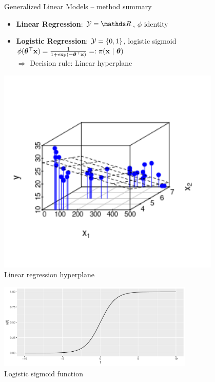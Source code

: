 \begin{vbframe}{Generalized Linear Models -- method summary}
\begin{itemize}
  \item \textbf{Linear Regression}: $\Yspace = \R$, $\phi$ identity
  \item \textbf{Logistic Regression}: $\mathcal{Y} = \{0, 1\}$, logistic sigmoid $\phi(\bm{\theta}^\top \mathbf{x}) = \frac{1}{1 + \exp(- \bm{\theta}^\top \mathbf{x})} 
  =: \pi(\mathbf{x}~|~ \bm{\theta})$\\
  $\Rightarrow$ Decision rule: Linear hyperplane
\end{itemize}
\begin{minipage}[b]{0.24\textwidth}
  \begin{center}
    \includegraphics[width=0.8\textwidth, trim=0 40 0 0, clip]{
    figure/lm_3d.png} \\
    \tiny{Linear regression hyperplane}
  \end{center}
\end{minipage}
\begin{minipage}[b]{0.24\textwidth}
  \begin{center}
     \includegraphics[width=0.7\textwidth, trim=0 40 0 0, clip]{../slides/supervised-classification/figure/reg_class_log_1}\\
    \tiny{Logistic sigmoid function}

\end{center}
\end{minipage}
\end{vbframe}
